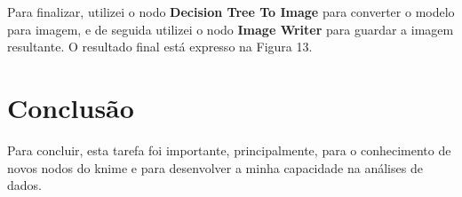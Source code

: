 \documentclass[a4paper, 12pt]{article}
\begin{document}
Para finalizar, utilizei o nodo \textbf{Decision Tree To Image} para converter o modelo para imagem, e de seguida utilizei o nodo \textbf{Image Writer} para guardar a imagem resultante. O resultado final está expresso na Figura 13.

\newpage

\section{Conclusão}
Para concluir, esta tarefa foi importante, principalmente, para o conhecimento de novos nodos do knime e para desenvolver a minha capacidade na análises de dados.  



\newpage
\end{document}
